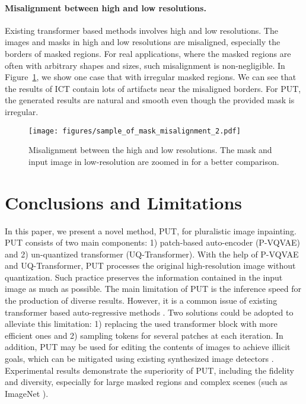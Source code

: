 \documentclass[10pt,twocolumn,letterpaper]{article}
\newcommand{\Fref}[1]{Figure~\ref{#1}}
\begin{document}
\paragraph{Misalignment between high and low resolutions.} Existing transformer based methods \cite{wan2021high} involves high and low resolutions. 
The images and masks in high and low resolutions are misaligned, especially the borders of masked regions. For real applications, where the masked regions are often with arbitrary shapes and sizes, such misalignment is non-negligible. In \Fref{figure: misalignment_between_high_and_low_resolution}, we show one case that with irregular masked regions. We can see that the results of ICT \cite{wan2021high} contain lots of artifacts near the misaligned borders. For PUT, the generated results are natural and smooth even though the provided mask is irregular. 



\begin{figure}[t]
	\centering
	\texttt{[image: figures/sample\_of\_mask\_misalignment\_2.pdf]} 
	\vspace{-15pt}
	\caption{Misalignment between the high and low resolutions. The mask and input image in low-resolution are zoomed in for a better comparison.}
	\vspace{-10pt}
	\label{figure: misalignment_between_high_and_low_resolution}
\end{figure}


\section{Conclusions and Limitations}
\label{sec: conclusion} 
In this paper, we present a novel method, PUT, for pluralistic image inpainting. PUT consists of two main components: 1) patch-based auto-encoder (P-VQVAE) and 2) un-quantized transformer (UQ-Transformer). With the help of P-VQVAE and UQ-Transformer, PUT processes the original high-resolution image without quantization. Such practice preserves the information contained in the input image as much as possible. 
The main limitation of PUT is the inference speed for the production of diverse results. However, it is a common issue of existing transformer based auto-regressive methods \cite{vaswani2017attention, wan2021high, ramesh2021zero, esser2021taming}. Two solutions could be adopted to alleviate this limitation: 1) replacing the used transformer block with more efficient ones \cite{ho2019axial, wang2020linformer} and 2) sampling tokens for several patches at each iteration. 
In addition, PUT may be used for editing the contents of images to achieve illicit goals, which can be mitigated using existing synthesized image detectors \cite{wang2020cnn}.
Experimental results demonstrate the superiority of PUT, including the fidelity and diversity, especially for large masked regions and complex scenes (such as ImageNet \cite{deng2009imagenet}). 
\end{document}
